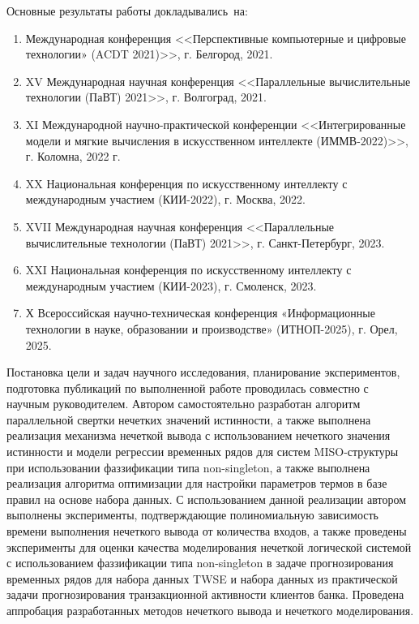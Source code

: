 {\probation}
Основные результаты работы докладывались~на:
\begin{enumerate}
	\item Международная конференция <<Перспективные компьютерные и цифровые технологии» (ACDT 2021)>>, г. Белгород, 2021.
	\item XV Международная научная конференция <<Параллельные вычислительные технологии (ПаВТ) 2021>>, г. Волгоград, 2021.
	\item XI Международной научно-практической конференции <<Интегрированные модели и мягкие вычисления в искусственном интеллекте (ИММВ-2022)>>, г. Коломна, 2022 г.
	\item XX Национальная конференция по искусственному интеллекту с международным участием (КИИ-2022), г. Москва, 2022.
	\item XVII Международная научная конференция <<Параллельные вычислительные технологии (ПаВТ) 2021>>, г. Санкт-Петербург, 2023.
	\item XXI Национальная конференция по искусственному интеллекту с международным участием (КИИ-2023), г. Смоленск, 2023.
	\item Х Всероссийская научно-техническая конференция «Информационные технологии в науке, образовании и производстве» (ИТНОП-2025), г. Орел, 2025.
\end{enumerate}

{\contribution} Постановка цели и задач научного исследования, планирование экспериментов, подготовка публикаций по выполненной работе проводилась совместно с научным руководителем. Автором самостоятельно разработан алгоритм параллельной свертки нечетких значений истинности, а также выполнена реализация механизма нечеткой вывода с использованием нечеткого значения истинности и модели регрессии временных рядов для систем MISO-структуры при использовании фаззификации типа non-singleton, а также выполнена реализация алгоритма оптимизации для настройки параметров термов в базе правил на основе набора данных. С использованием данной реализации автором выполнены эксперименты, подтверждающие полиномиальную зависимость времени выполнения нечеткого вывода от количества входов, а также проведены эксперименты для оценки качества моделирования нечеткой логической системой с использованием фаззификации типа non-singleton в задаче прогнозирования временных рядов для набора данных TWSE и набора данных из практической задачи прогнозирования транзакционной активности клиентов банка. Проведена аппробация разработанных методов нечеткого вывода и нечеткого моделирования.


